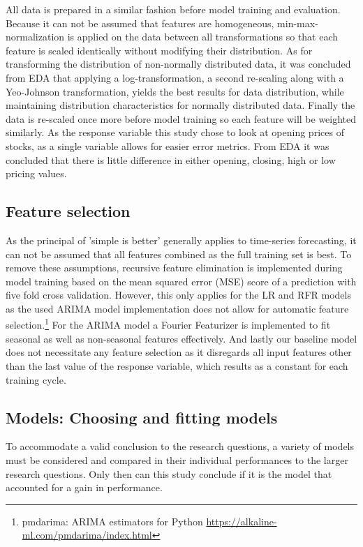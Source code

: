 All data is prepared in a similar fashion before model training and evaluation. Because it can not be assumed that features are homogeneous, min-max-normalization is applied on the data between all transformations so that each feature is scaled identically without modifying their distribution. As for transforming the distribution of non-normally distributed data, it was concluded from EDA that applying a log-transformation, a second re-scaling along with a Yeo-Johnson transformation, yields the best results for data distribution, while maintaining distribution characteristics for normally distributed data. Finally the data is re-scaled once more before model training so each feature will be weighted similarly. As the response variable this study chose to look at opening prices of stocks, as a single variable allows for easier error metrics. From EDA it was concluded that there is little difference in either opening, closing, high or low pricing values. %

\subsection{Feature selection}
As the principal of 'simple is better' generally applies to time-series forecasting, it can not be assumed that all features combined as the full training set is best. To remove these assumptions, recursive feature elimination is implemented during model training based on the mean squared error (MSE) score of a prediction with five fold cross validation. However, this only applies for the LR and RFR models as the used ARIMA model implementation does not allow for automatic feature selection.\footnote{pmdarima: ARIMA estimators for Python \url{https://alkaline-ml.com/pmdarima/index.html}} For the ARIMA model a Fourier Featurizer is implemented to fit seasonal as well as non-seasonal features effectively. And lastly our baseline model does not necessitate any feature selection as it disregards all input features other than the last value of the response variable, which results as a constant for each training cycle.

\subsection{Models: Choosing and fitting models}
\label{sec:models}
To accommodate a valid conclusion to the research questions, a variety of models must be considered  and compared in their individual performances to the larger research questions. Only then can this study conclude if it is the model that accounted for a gain in performance.

